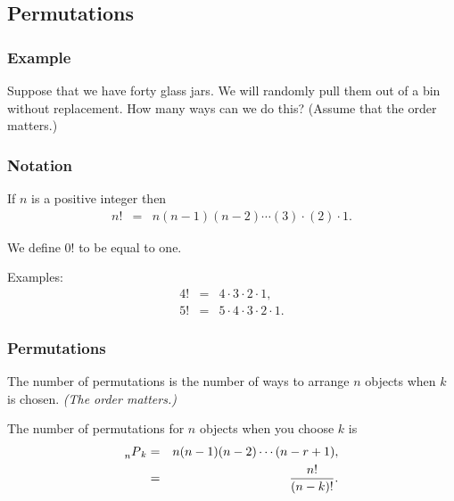 \subsection{Permutations}

\begin{frame}
  \frametitle{Example}
  Suppose that we have forty glass jars. We will randomly pull them
  out of a bin without replacement. How many ways can we do this?
  (Assume that the order matters.)
  \vfill


\end{frame}

\begin{frame}
  \frametitle{Notation}

  \begin{definition}[Factorials]

    If $n$ is a positive integer then
    \begin{eqnarray}
      n! & = & n(n-1)(n-2)\cdots (3) \cdot (2) \cdot 1.
    \end{eqnarray}

    We define $0!$ to be equal to one.    
  \end{definition}

  Examples:
  \begin{eqnarray}
    4! & = & 4 \cdot 3  \cdot 2 \cdot 1, \\
    5! & = & 5 \cdot 4 \cdot 3  \cdot 2 \cdot 1.
  \end{eqnarray}
  
\end{frame}



\begin{frame}
  \frametitle{Permutations}

  \begin{definition}[Permutations]
    The number of permutations is the number of ways to arrange $n$
    objects when $k$ is chosen. \textit{(The order matters.)}
  \end{definition}

  \begin{definition}[Notation]
    The number of permutations for $n$ objects when you choose $k$
    is 
    \begin{eqnarray*}
      \prescript{~}{n}{P}_k & = & n(n-1)(n-2)\cdots(n-r+1), \\
                            & = & \frac{n!}{(n-k)!}.
    \end{eqnarray*}
  \end{definition}

\end{frame}

